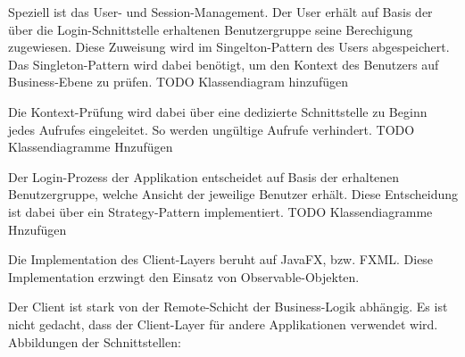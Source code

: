 Speziell ist das User- und Session-Management. Der User erhält auf Basis der über die Login-Schnittstelle erhaltenen Benutzergruppe seine Berechigung zugewiesen. Diese Zuweisung wird im Singelton-Pattern des Users abgespeichert.
Das Singleton-Pattern wird dabei benötigt, um den Kontext des Benutzers auf Business-Ebene zu prüfen.
TODO Klassendiagram hinzufügen

Die Kontext-Prüfung wird dabei über eine dedizierte Schnittstelle zu Beginn jedes Aufrufes eingeleitet. So werden ungültige Aufrufe verhindert.
TODO Klassendiagramme Hnzufügen

Der Login-Prozess der Applikation entscheidet auf Basis der erhaltenen Benutzergruppe, welche Ansicht der jeweilige Benutzer erhält. Diese Entscheidung ist dabei über ein Strategy-Pattern implementiert. 
TODO Klassendiagramme Hnzufügen

Die Implementation des Client-Layers beruht auf JavaFX, bzw. FXML. Diese Implementation erzwingt den Einsatz von Observable-Objekten.

Der Client ist stark von der Remote-Schicht der Business-Logik abhängig. Es ist nicht gedacht, dass der Client-Layer für andere Applikationen verwendet wird.
\newline
Abbildungen der Schnittstellen:

